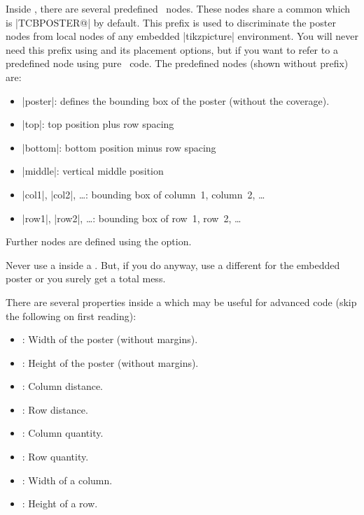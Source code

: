 \clearpage
  Inside , there are several predefined \tikzname\ nodes.
  These nodes share a common  which is
  |TCBPOSTER@| by default. This prefix is used to discriminate the
  poster nodes from local nodes of any embedded |tikzpicture| environment.
  You will never need this prefix using  and its
  placement options, but if you want to refer to a predefined node using
  pure \tikzname\ code.
  The predefined nodes (shown without prefix) are:
  \begin{itemize}
  \item|poster|: defines the bounding box of the poster (without the coverage).
  \item|top|: top position plus row spacing
  \item|bottom|: bottom position minus row spacing
  \item|middle|: vertical middle position
  \item|col1|, |col2|, \ldots: bounding box of column~1, column~2, \ldots
  \item|row1|, |row2|, \ldots: bounding box of row~1, row~2, \ldots
  \end{itemize}
  Further nodes are defined using the  option.

  \begin{marker}
  Never use a  inside a .
  But, if you do anyway, use a different  for
  the embedded poster or you surely get a total mess.
  \end{marker}

  There are several properties inside a  which may be useful
  for advanced code (skip the following on first reading):
  \begin{itemize}
  \item{}: Width of the poster (without margins).
  \item{}: Height of the poster (without margins).
  \item{}: Column distance.
  \item{}: Row distance.
  \item{}: Column quantity.
  \item{}: Row quantity.
  \item{}: Width of a column.
  \item{}: Height of a row.
  \end{itemize}

